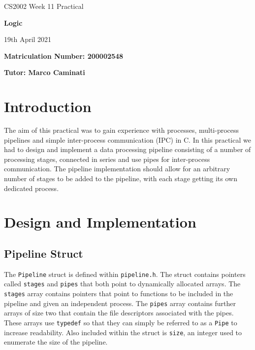 \documentclass{article}
\begin{document}
    \nocite{*}

    \begin{center}
        \Huge
        CS2002 Week 11 Practical

        \vspace{0.5cm}

        \textbf{Logic}

        \vspace{1cm}
        \LARGE
        19th April 2021

        \large
        \vspace{1.5cm}

        \textbf{Matriculation Number: 200002548}

        \vspace{0.5cm}

        \textbf{Tutor: Marco Caminati}

    \end{center}

    \vspace*{3cm}

    \tableofcontents

    \newpage
    \section{Introduction}
    The aim of this practical was to gain experience with processes, multi-process pipelines and simple inter-process communication (IPC)
    in C. In this practical we had to design and implement a data processing pipeline consisting of a number of processing stages, connected in series
    and use pipes for inter-process communication.
    The pipeline implementation should allow for an arbitrary number of stages to be added to the pipeline, with each stage getting its own dedicated process.

    \section{Design and Implementation}
    \subsection{Pipeline Struct}
    The \verb+Pipeline+ struct is defined within \verb+pipeline.h+.
    The struct contains pointers called \verb+stages+ and \verb+pipes+ that both point to dynamically allocated arrays.
    The \verb+stages+ array contains pointers that point to functions to be included in the pipeline and given an independent process.
    The \verb+pipes+ array contains further arrays of size two that contain the file descriptors associated with the pipes.
    These arrays use \verb+typedef+ so that they can simply be referred to as a \verb+Pipe+ to increase readability.
    Also included within the struct is \verb+size+, an integer used to enumerate the size of the pipeline.
\end{document}
